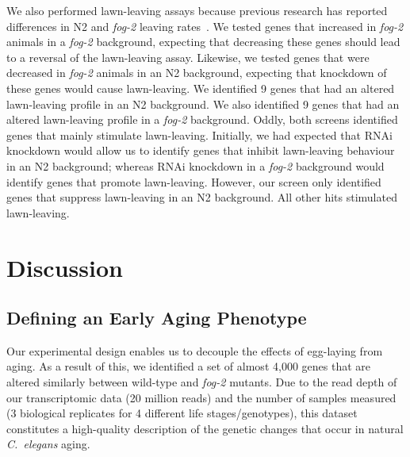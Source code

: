 \documentclass[9pt,twocolumn,twoside]{gsag3jnl}
\newcommand{\cel}{\emph{C.~elegans}}
\newcommand{\fog}{\emph{fog-2}}
\begin{document}
We also performed lawn-leaving assays because previous research has reported differences in N2 and \fog{} leaving rates~\citep{}. We tested genes that increased in \fog{} animals in a \fog{} background, expecting that decreasing these genes should lead to a reversal of the lawn-leaving assay. Likewise, we tested genes that were decreased in \fog{} animals in an N2 background, expecting that knockdown of these genes would cause lawn-leaving. We identified 9 genes that had an altered lawn-leaving profile in an N2 background.
We also identified 9 genes that had an altered lawn-leaving profile in a \fog{} background. Oddly, both screens identified  genes that mainly stimulate lawn-leaving. Initially, we had expected that RNAi knockdown would allow us to identify genes that inhibit lawn-leaving behaviour in an N2 background; whereas RNAi knockdown in a \fog{} background would identify genes that promote lawn-leaving. However, our screen only identified genes that suppress lawn-leaving in an N2 background. All other hits stimulated lawn-leaving.






\section*{Discussion}
\label{sec:discussion}

\subsection*{Defining an Early Aging Phenotype}
\label{sub:Defining an Early Aging Phenotype}

Our experimental design enables us to decouple the effects of egg-laying from aging. As a result of this, we identified a set of almost 4,000 genes that are altered similarly between wild-type and \fog{} mutants. Due to the read depth of our transcriptomic data (20 million reads) and the number of samples measured (3 biological replicates for 4 different life stages/genotypes), this dataset constitutes a high-quality description of the genetic changes that occur in natural \cel{} aging.
\end{document}
